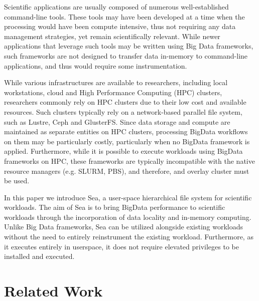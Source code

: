 \documentclass[10pt,journal,compsoc]{IEEEtran}
\begin{document}
Scientific applications are usually composed of numerous well-established command-line tools. These tools
may have been developed at a time when the processing would have been compute intensive, thus not requiring any
data management strategies, yet remain scientifically relevant. While newer applications
that leverage such tools may be written using Big Data frameworks, such frameworks are not designed to transfer
data in-memory to command-line applications, and thus would require some instrumentation.

While various infrastructures are available to researchers, including local workstations, cloud and 
High Performance Computing (HPC) clusters, researchers commonly rely on HPC clusters due to their low cost and available
resources. Such clusters typically rely on a network-based parallel file system, such as Lustre, Ceph and GlusterFS.
Since data storage and compute are maintained as separate entities on HPC clusters, processing BigData workflows on them
may be particularly costly, particularly when no BigData framework is applied. Furthermore, while it is possible to execute
workloads using BigData frameworks on HPC, these frameworks are typically incompatible with the native resource managers (e.g. SLURM, PBS),
and therefore, and overlay cluster must be used.

In this paper we introduce Sea, a user-space hierarchical file system for scientific workloads. The aim of Sea
is to bring BigData performance to scientific workloads through the incorporation of data locality and
in-memory computing. Unlike Big Data frameworks, Sea can be utilized alongside existing workloads without
the need to entirely reinstrument the existing workload. Furthermore, as it executes entirely in userspace,
it does not require elevated privileges to be installed and executed.







\section{Related Work}
\end{document}
